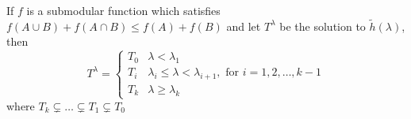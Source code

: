 \begin{proposition}\label{prop:struc}
If $f$ is a submodular function which satisfies $f(A\cup B) + f(A\cap B) \leq f(A) + f(B)$ and 
let $T^{\lambda}$ be the solution to $\tilde{h}(\lambda)$, then 
\begin{equation}\label{eq:Alambda}
T^{\lambda}=\begin{cases}
T_0 & \lambda < \lambda_1 \\
T_i & \lambda_i \leq \lambda < \lambda_{i+1}, \textrm{ for } i=1, 2, \dots, k-1 \\
T_k & \lambda \geq \lambda_{k}
\end{cases}
\end{equation}
where $T_k \subsetneq  \dots \subsetneq T_1 \subsetneq T_0$
\end{proposition}